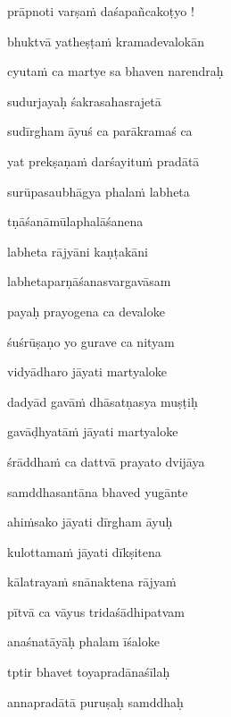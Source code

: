 \nemslokad 
prāpnoti varṣaṁ daśapañcakoṭyo !  \veg\dontdisplaylinenum

\ujvers\nemsloka 
bhuktvā yatheṣṭaṁ kramadevalokān
\dontdisplaylinenum

\nemslokab 
cyutaṁ ca martye sa bhaven narendraḥ \danda\dontdisplaylinenum

\nemslokac 
sudurjayaḥ śakrasahasrajetā
\dontdisplaylinenum

\nemslokad 
sudīrgham āyuś ca parākramaś ca \veg\dontdisplaylinenum

\ujvers\nemsloka 
yat prekṣaṇaṁ darśayituṁ pradātā
\dontdisplaylinenum

\nemslokab 
surūpasaubhāgya phalaṁ labheta \danda\dontdisplaylinenum

\nemslokac 
tṇāśanāmūlaphalāśanena
\dontdisplaylinenum

\nemslokad 
labheta rājyāni kaṇṭakāni \veg\dontdisplaylinenum

\ujvers\nemsloka 
labhetaparṇāśanasvargavāsam
\dontdisplaylinenum

\nemslokab 
payaḥ prayogena ca devaloke \danda\dontdisplaylinenum

\nemslokac 
śuśrūṣaṇo yo gurave ca nityam
\dontdisplaylinenum

\nemslokad 
vidyādharo jāyati martyaloke \veg\dontdisplaylinenum

\ujvers\nemsloka 
dadyād gavāṁ dhāsatṇasya muṣṭiḥ
\dontdisplaylinenum

\nemslokab 
gavāḍhyatāṁ jāyati martyaloke \danda\dontdisplaylinenum

\nemslokac 
śrāddhaṁ ca dattvā prayato dvijāya
\dontdisplaylinenum

\nemslokad 
samddhasantāna bhaved yugānte \veg\dontdisplaylinenum

\ujvers\nemsloka 
ahiṁsako jāyati dīrgham āyuḥ
\dontdisplaylinenum

\nemslokab 
kulottamaṁ jāyati dīkṣitena \danda\dontdisplaylinenum

\nemslokac 
kālatrayaṁ snānaktena rājyaṁ
\dontdisplaylinenum

\nemslokad 
pītvā ca vāyus tridaśādhipatvam \veg\dontdisplaylinenum

\ujvers\nemsloka 
anaśnatāyāḥ phalam īśaloke
\dontdisplaylinenum

\nemslokab 
tptir bhavet toyapradānaśīlaḥ \danda\dontdisplaylinenum

\nemslokac 
annapradātā puruṣaḥ samddhaḥ
\dontdisplaylinenum

